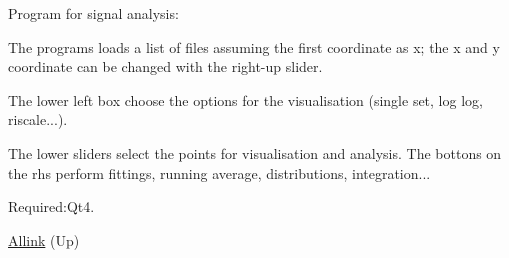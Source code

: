 \-Program for signal analysis\-:\par
 \-The programs loads a list of files assuming the first coordinate as x; the x and y coordinate can be changed with the right-\/up slider. \par
 \-The lower left box choose the options for the visualisation (single set, log log, riscale...). \par
 \-The lower sliders select the points for visualisation and analysis. \-The bottons on the rhs perform fittings, running average, distributions, integration... \par
 \-Required\-:\-Qt4. 
\begin{DoxyItemize}
\item \hyperlink{index}{\-Allink} (\-Up)  
\end{DoxyItemize}